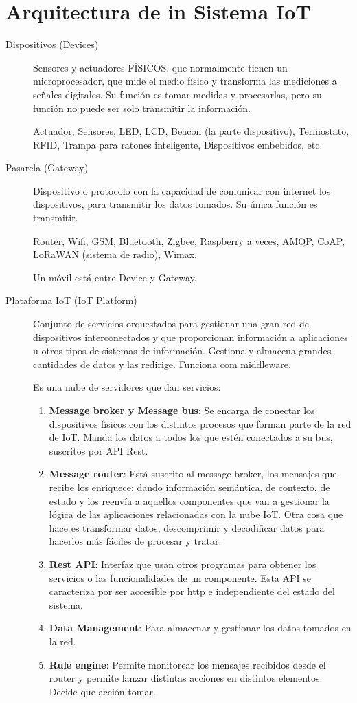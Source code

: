 \documentclass[12pt]{report} %
\begin{document}
\section{Arquitectura de in Sistema
IoT}
\begin{description}
	\item[Dispositivos (Devices)] Sensores y actuadores FÍSICOS, que
	normalmente tienen un microprocesador, que mide el medio físico y
	transforma las mediciones a señales digitales. Su función es tomar
	medidas y procesarlas, pero su función no puede ser solo transmitir la
	información.
	
	Actuador, Sensores, LED, LCD, Beacon (la parte dispositivo), Termostato,
	RFID, Trampa para ratones inteligente, Dispositivos embebidos, etc.
	\item[Pasarela (Gateway)] Dispositivo o protocolo con la capacidad de
	comunicar con internet los dispositivos, para transmitir los datos
	tomados. Su única función es transmitir.
	
	Router, Wifi, GSM, Bluetooth, Zigbee, Raspberry a veces, AMQP, CoAP,
	LoRaWAN (sistema de radio), Wimax.
	
	Un móvil está entre Device y Gateway.
	\item[Plataforma IoT (IoT Platform)] Conjunto de servicios
	orquestados para gestionar una gran red de dispositivos interconectados
	y que proporcionan información a aplicaciones u otros tipos de sistemas
	de información. Gestiona y almacena grandes cantidades de datos y las
	redirige. Funciona com middleware.
	
	Es una nube de servidores que dan servicios:
	
	\begin{enumerate}
		\item \textbf{Message broker y Message bus}: Se encarga de conectar los
		dispositivos físicos con los distintos procesos que forman parte de la
		red de IoT. Manda los datos a todos los que estén conectados a su bus,
		suscritos por API Rest.
		\item
		\textbf{Message router}: Está suscrito al message broker, los mensajes
		que recibe los enriquece; dando información semántica, de contexto, de
		estado y los reenvía a aquellos componentes que van a gestionar la
		lógica de las aplicaciones relacionadas con la nube IoT. Otra cosa que
		hace es transformar datos, descomprimir y decodificar datos para
		hacerlos más fáciles de procesar y tratar.
		\item
		\textbf{Rest API}: Interfaz que usan otros programas para obtener los
		servicios o las funcionalidades de un componente. Esta API se
		caracteriza por ser accesible por http e independiente del estado del
		sistema.
		\item
		\textbf{Data Management}: Para almacenar y gestionar los datos tomados
		en la red.
		\item
		\textbf{Rule engine}: Permite monitorear los mensajes recibidos desde
		el router y permite lanzar distintas acciones en distintos elementos.
		Decide que acción tomar.
		

\end{enumerate}
\end{description}
\end{document}
